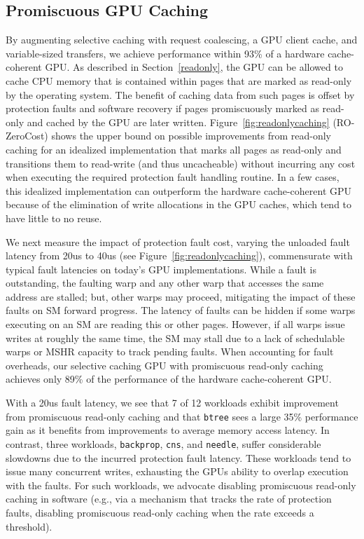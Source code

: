 \subsection{Promiscuous GPU Caching}
\label{readonlyresults}
By augmenting selective caching with request coalescing, a GPU client cache, and variable-sized transfers,
we achieve performance within 93\% of a hardware cache-coherent GPU\@. 
As described in Section~\ref{readonly}, the GPU can be allowed to cache CPU memory that is contained
within pages that are marked as read-only by the operating system. The benefit of caching data
from such pages is offset by protection
faults and software recovery if pages promiscuously marked as read-only 
and cached by the GPU are later written.
Figure~\ref{fig:readonlycaching} (RO-ZeroCost) shows the upper bound on possible improvements from read-only 
caching for an idealized implementation that marks all pages as read-only and transitions them to
read-write (and thus uncacheable)
without incurring any cost when executing the required protection fault handling routine.  In a few cases, 
this idealized implementation can outperform 
the hardware cache-coherent GPU because of the elimination of write allocations in the GPU caches,
which tend to have little to no reuse.

We next measure the impact of protection fault cost, varying the unloaded fault latency from
20us to 40us (see Figure~\ref{fig:readonlycaching}), commensurate with typical fault latencies on today's GPU implementations.
While a fault is outstanding, the faulting warp and any other warp that accesses
the same address are stalled; but, other warps may proceed, mitigating the impact of these faults on SM forward progress.  
The latency of faults can be hidden if some warps executing on an SM are reading
this or other pages.  However, if all warps issue writes at
roughly the same time, the SM may stall due to a lack of schedulable warps or MSHR
capacity to track pending faults. When accounting for fault overheads, 
our selective caching GPU with promiscuous read-only caching achieves only 89\% of the performance of the 
hardware cache-coherent GPU.

With a 20us fault latency, we see that 7 of 12 workloads 
exhibit improvement from promiscuous read-only caching
and that \texttt{btree} sees a large 35\% performance gain
as it benefits from improvements to average memory
access latency.
In contrast, three workloads, \texttt{backprop}, \texttt{cns}, and
\texttt{needle}, suffer considerable slowdowns due to the incurred protection fault latency.
These workloads tend to issue many concurrent writes, exhausting the GPUs
ability to overlap execution with the faults.  For such workloads, we advocate
disabling promiscuous read-only caching in software (e.g., via a mechanism that tracks
the rate of protection faults, disabling promiscuous read-only caching when the rate
exceeds a threshold).


